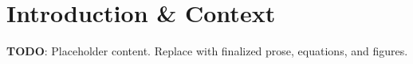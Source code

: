 \section{Introduction \& Context}
\label{sec:introduction-context}

\textbf{TODO}: Placeholder content. Replace with finalized prose, equations, and figures.

